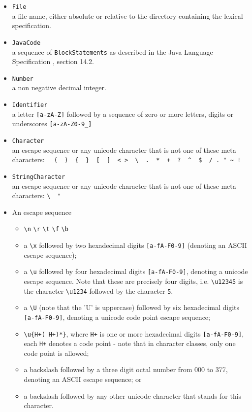 \begin{itemize}
\item
  \texttt{File}\\a file name, either absolute or relative to the
  directory containing the lexical specification.
\item
  \texttt{JavaCode}\\a sequence of \texttt{BlockStatements} as described
  in the Java Language Specification \autocite{LangSpec}, section 14.2.
\item
  \texttt{Number}\\a non negative decimal integer.
\item
  \texttt{Identifier}\\a letter \texttt{{[}a-zA-Z{]}} followed by a
  sequence of zero or more letters, digits or underscores
  \texttt{{[}a-zA-Z0-9\_{]}}
\item
  \texttt{Character}\\an escape sequence or any unicode character that
  is not one of these meta characters:
  \texttt{\textbar{}\ \ (\ \ )\ \ \{\ \ \}\ \ {[}\ \ {]}\ \ \textless{}\ \textgreater{}\ \ \textbackslash{}\ \ .\ \ *\ \ +\ \ ?\ \ \^{}\ \ \$\ \ /\ .\ "\ \textasciitilde{}\ !}
\item
  \texttt{StringCharacter}\\an escape sequence or any unicode character
  that is not one of these meta characters:
  \texttt{\textbackslash{}\ \ "}
\item
  An escape sequence

  \begin{itemize}
  \item
    \texttt{\textbackslash{}n} \texttt{\textbackslash{}r}
    \texttt{\textbackslash{}t} \texttt{\textbackslash{}f}
    \texttt{\textbackslash{}b}
  \item
    a \texttt{\textbackslash{}x} followed by two hexadecimal digits
    \texttt{{[}a-fA-F0-9{]}} (denoting an ASCII escape sequence);
  \item
    a \texttt{\textbackslash{}u} followed by four hexadecimal digits
    \texttt{{[}a-fA-F0-9{]}}, denoting a unicode escape sequence. Note
    that these are precisely four digits, i.e.
    \texttt{\textbackslash{}u12345} is the character
    \texttt{\textbackslash{}u1234} followed by the character \texttt{5}.
  \item
    a \texttt{\textbackslash{}U} (note that the 'U' is uppercase)
    followed by six hexadecimal digits \texttt{{[}a-fA-F0-9{]}},
    denoting a unicode code point escape sequence;
  \item
    \texttt{\textbackslash{}u\{H+(\ H+)*\}}, where \texttt{H+} is one or
    more hexadecimal digits \texttt{{[}a-fA-F0-9{]}}, each \texttt{H+}
    denotes a code point - note that in character classes, only one code
    point is allowed;
  \item
    a backslash followed by a three digit octal number from 000 to 377,
    denoting an ASCII escape sequence; or
  \item
    a backslash followed by any other unicode character that stands for
    this character.
  \end{itemize}
\end{itemize}

